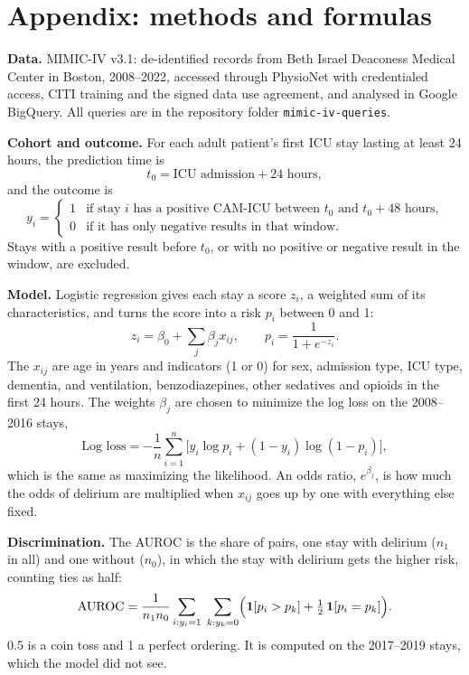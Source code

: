 \documentclass[11pt]{article}
\begin{document}
\section*{Appendix: methods and formulas}

\textbf{Data.} MIMIC-IV v3.1: de-identified records from Beth Israel Deaconess Medical Center in Boston, 2008--2022, accessed through PhysioNet with credentialed access, CITI training and the signed data use agreement, and analysed in Google BigQuery. All queries are in the repository folder \texttt{mimic-iv-queries}.

\textbf{Cohort and outcome.} For each adult patient's first ICU stay lasting at least 24 hours, the prediction time is
\begin{equation*}
	t_0 = \text{ICU admission} + 24 \text{ hours},
\end{equation*}
and the outcome is
\begin{equation*}
	y_i =
	\begin{cases}
		1 & \text{if stay } i \text{ has a positive CAM-ICU between } t_0 \text{ and } t_0 + 48 \text{ hours,} \\
		0 & \text{if it has only negative results in that window.}
	\end{cases}
\end{equation*}
Stays with a positive result before $t_0$, or with no positive or negative result in the window, are excluded.

\textbf{Model.} Logistic regression gives each stay a score $z_i$, a weighted sum of its characteristics, and turns the score into a risk $p_i$ between 0 and 1:
\begin{equation*}
	z_i = \beta_0 + \sum_{j} \beta_j x_{ij}, \qquad p_i = \frac{1}{1 + e^{-z_i}} .
\end{equation*}
The $x_{ij}$ are age in years and indicators (1 or 0) for sex, admission type, ICU type, dementia, and ventilation, benzodiazepines, other sedatives and opioids in the first 24 hours. The weights $\beta_j$ are chosen to minimize the log loss on the 2008--2016 stays,
\begin{equation*}
	\text{Log loss} = -\frac{1}{n} \sum_{i=1}^{n} \bigl[ y_i \log p_i + (1 - y_i) \log (1 - p_i) \bigr] ,
\end{equation*}
which is the same as maximizing the likelihood. An odds ratio, $e^{\beta_j}$, is how much the odds of delirium are multiplied when $x_{ij}$ goes up by one with everything else fixed.

\textbf{Discrimination.} The AUROC is the share of pairs, one stay with delirium ($n_1$ in all) and one without ($n_0$), in which the stay with delirium gets the higher risk, counting ties as half:
\begin{equation*}
	\text{AUROC} = \frac{1}{n_1 n_0} \sum_{i : y_i = 1} \; \sum_{k : y_k = 0} \Bigl( \mathbf{1}[p_i > p_k] + \tfrac{1}{2} \, \mathbf{1}[p_i = p_k] \Bigr) .
\end{equation*}
0.5 is a coin toss and 1 a perfect ordering. It is computed on the 2017--2019 stays, which the model did not see.
\end{document}
